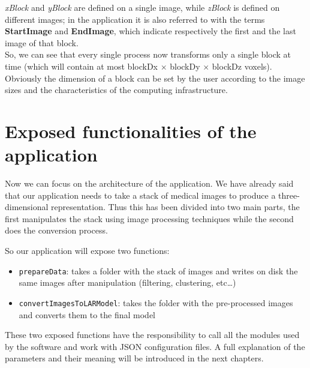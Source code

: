 \textit{xBlock} and \textit{yBlock} are defined on a single image, while \textit{zBlock} is defined on different images; in the application it is also referred to with the terms \textbf{StartImage} and \textbf{EndImage}, which indicate respectively the first and the last image of that block.\\

So, we can see that every single process now transforms only a single block at time (which will contain at most blockDx $\times$ blockDy $\times$ blockDz voxels). Obviously the dimension of a block can be set by the user according to the image sizes and the characteristics of the computing infrastructure.

\section{Exposed functionalities of the application}\label{sec31:Functionalities}

Now we can focus on the architecture of the application. We have already said that our application needs to take a stack of medical images to produce a three-dimensional representation. Thus this has been divided into two main parts, the first manipulates the stack using image processing techniques while the second does the conversion process.

So our application will expose two functions:
\begin{itemize}
 \item \texttt{prepareData}: takes a folder with the stack of images and writes on disk the same images after manipulation (filtering, clustering, etc\dots)
 \item \texttt{convertImagesToLARModel}: takes the folder with the pre-processed images and converts them to the final model
\end{itemize}

These two exposed functions have the responsibility to call all the modules used by the software and work with JSON configuration files. A full explanation of the parameters and their meaning will be introduced in the next chapters.\\

